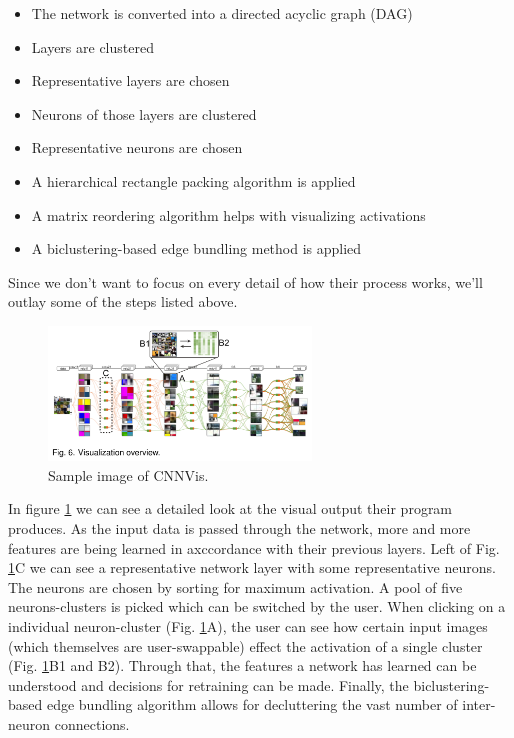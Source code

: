 \documentclass{acmsiggraph}               %
\begin{document}
\begin{itemize}
  \item The network is converted into a directed acyclic graph (DAG)
  \item Layers are clustered
  \item Representative layers are chosen
  \item Neurons of those layers are clustered
  \item Representative neurons are chosen
  \item A hierarchical rectangle packing algorithm is applied
  \item A matrix reordering algorithm helps with visualizing activations
  \item A biclustering-based edge bundling method is applied
\end{itemize}

Since we don't want to focus on every detail of how their process works, we'll outlay some of the steps listed above.\\

\begin{figure}
  \centering
  \includegraphics[width=2.75in]{cnnvis_detail}
  \caption{Sample image of CNNVis. \protect\cite{Liu2016}}
  \label{fig:cnnvis_detail}
\end{figure}

In figure \ref{fig:cnnvis_detail} we can see a detailed look at the visual output their program produces. As the input data is passed through the network, more and more features are being learned in axccordance with their previous layers. Left of Fig. \ref{fig:cnnvis_detail}C we can see a representative network layer with some representative neurons. The neurons are chosen by sorting for maximum activation. A pool of five neurons-clusters is picked which can be switched by the user. When clicking on a individual neuron-cluster (Fig. \ref{fig:cnnvis_detail}A), the user can see how certain input images (which themselves are user-swappable) effect the activation of a single cluster (Fig. \ref{fig:cnnvis_detail}B1 and B2). Through that, the features a network has learned can be understood and decisions for retraining can be made. Finally, the biclustering-based edge bundling algorithm allows for decluttering the vast number of inter-neuron connections.\\
\end{document}
